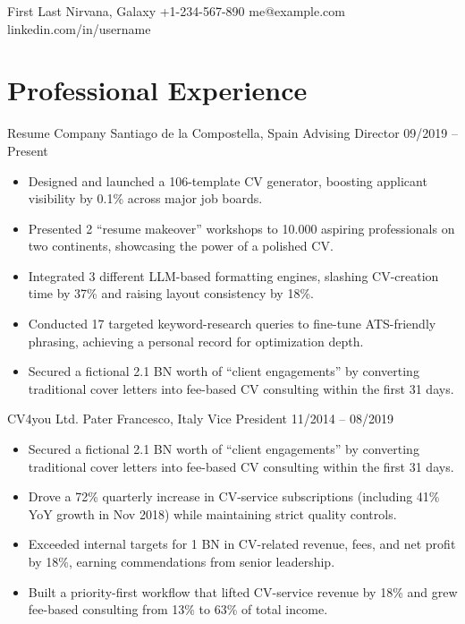 \documentclass[10pt, a4paper]{bankingcv}
\begin{document}
	
	\makeheader
	{First Last} 		%
	{Nirvana, Galaxy}	%
	{+1-234-567-890} 	%
	{me@example.com} 	%
	{linkedin.com/in/username} %
	
	\section{Professional Experience}
	
	\cventry
	{Resume Company} 						%
	{Santiago de la Compostella, Spain}		%
	{Advising Director} 					%
	{09/2019 -- Present} 					%
	\begin{itemize}
		\item Designed and launched a 106-template CV generator, boosting applicant visibility by 0.1\% across major job boards.
		\item Presented 2 “resume makeover” workshops to 10.000 aspiring professionals on two continents, showcasing the power of a polished CV.
		\item Integrated 3 different LLM-based formatting engines, slashing CV-creation time by 37\% and raising layout consistency by 18\%.
		\item Conducted 17 targeted keyword-research queries to fine-tune ATS-friendly phrasing, achieving a personal record for optimization depth.
		\item Secured a fictional 2.1 BN worth of “client engagements” by converting traditional cover letters into fee-based CV consulting within the first 31 days.
	\end{itemize}
	
	\cventry
	{CV4you Ltd.} 
	{Pater Francesco, Italy} 
	{Vice President} 
	{11/2014 -- 08/2019} 
	\begin{itemize}	
		\item Secured a fictional 2.1 BN worth of “client engagements” by converting traditional cover letters into fee-based CV consulting within the first 31 days.
		\item Drove a 72\% quarterly increase in CV-service subscriptions (including 41\% YoY growth in Nov 2018) while maintaining strict quality controls.
		\item Exceeded internal targets for 1 BN in CV-related revenue, fees, and net profit by 18\%, earning commendations from senior leadership.
		\item Built a priority-first workflow that lifted CV-service revenue by 18\% and grew fee-based consulting from 13\% to 63\% of total income.
	\end{itemize}
	
\end{document}
